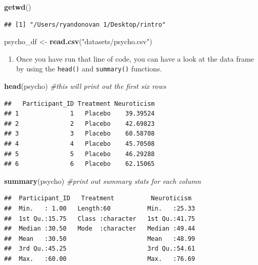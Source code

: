 \documentclass[
]{book}
\newenvironment{Shaded}{\begin{snugshade}}{\end{snugshade}}
\newcommand{\CommentTok}[1]{\textcolor[rgb]{0.56,0.35,0.01}{\textit{#1}}}
\newcommand{\FunctionTok}[1]{\textcolor[rgb]{0.13,0.29,0.53}{\textbf{#1}}}
\newcommand{\NormalTok}[1]{#1}
\newcommand{\OtherTok}[1]{\textcolor[rgb]{0.56,0.35,0.01}{#1}}
\newcommand{\StringTok}[1]{\textcolor[rgb]{0.31,0.60,0.02}{#1}}
\providecommand{\tightlist}{%
  \setlength{\itemsep}{0pt}\setlength{\parskip}{0pt}}
\begin{document}
\begin{Shaded}
\begin{Highlighting}[]
\FunctionTok{getwd}\NormalTok{()}
\end{Highlighting}
\end{Shaded}

\begin{verbatim}
## [1] "/Users/ryandonovan 1/Desktop/rintro"
\end{verbatim}

\begin{Shaded}
\begin{Highlighting}[]
\NormalTok{psycho\_df }\OtherTok{\textless{}{-}} \FunctionTok{read.csv}\NormalTok{(}\StringTok{"datasets/psycho.csv"}\NormalTok{)}
\end{Highlighting}
\end{Shaded}

\begin{enumerate}
\def\labelenumi{\arabic{enumi}.}
\setcounter{enumi}{2}
\tightlist
\item
  Once you have run that line of code, you can have a look at the data frame by using the \texttt{head()} and \texttt{summary()} functions.
\end{enumerate}

\begin{Shaded}
\begin{Highlighting}[]
\FunctionTok{head}\NormalTok{(psycho) }\CommentTok{\#this will print out the first six rows}
\end{Highlighting}
\end{Shaded}

\begin{verbatim}
##   Participant_ID Treatment Neuroticism
## 1              1   Placebo    39.39524
## 2              2   Placebo    42.69823
## 3              3   Placebo    60.58708
## 4              4   Placebo    45.70508
## 5              5   Placebo    46.29288
## 6              6   Placebo    62.15065
\end{verbatim}

\begin{Shaded}
\begin{Highlighting}[]
\FunctionTok{summary}\NormalTok{(psycho) }\CommentTok{\#print out summary stats for each column}
\end{Highlighting}
\end{Shaded}

\begin{verbatim}
##  Participant_ID   Treatment          Neuroticism   
##  Min.   : 1.00   Length:60          Min.   :25.33  
##  1st Qu.:15.75   Class :character   1st Qu.:41.75  
##  Median :30.50   Mode  :character   Median :49.44  
##  Mean   :30.50                      Mean   :48.99  
##  3rd Qu.:45.25                      3rd Qu.:54.61  
##  Max.   :60.00                      Max.   :76.69
\end{verbatim}
\end{document}
